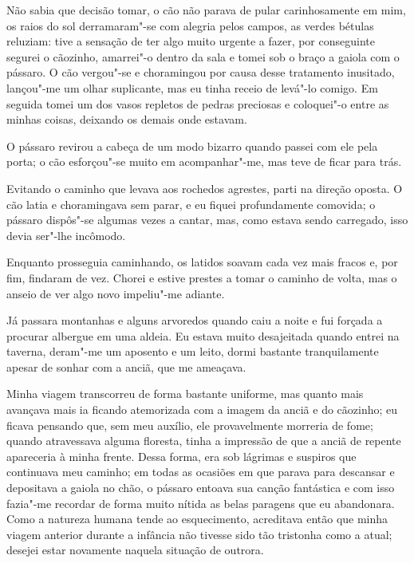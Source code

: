  Não sabia que decisão tomar, o cão não parava de pular carinhosamente
em mim, os raios do sol derramaram"-se com alegria pelos campos, as
verdes bétulas reluziam: tive a sensação de ter algo muito urgente a
fazer, por conseguinte segurei o cãozinho, amarrei"-o dentro da sala e
tomei sob o braço a gaiola com o pássaro. O cão vergou"-se e choramingou
por causa desse tratamento inusitado, lançou"-me um olhar suplicante,
mas eu tinha receio de levá"-lo comigo. Em seguida tomei um dos vasos
repletos de pedras preciosas e coloquei"-o entre as minhas coisas, deixando os
demais onde estavam.

 O pássaro revirou a cabeça de um modo bizarro quando passei com ele
pela porta; o cão esforçou"-se muito em acompanhar"-me, mas teve de
ficar para trás.

 Evitando o caminho que levava aos rochedos agrestes, parti na direção
oposta. O cão latia e choramingava sem parar, e eu fiquei profundamente
comovida; o pássaro dispôs"-se algumas vezes a cantar, mas, como estava
sendo carregado, isso devia ser"-lhe incômodo.

 Enquanto prosseguia caminhando, os latidos soavam cada vez mais
fracos e, por fim, findaram de vez. Chorei e estive prestes a tomar o
caminho de volta, mas o anseio de ver algo novo impeliu"-me adiante.

 Já passara montanhas e alguns arvoredos quando caiu a noite e fui
forçada a procurar albergue em uma aldeia. Eu estava muito desajeitada
quando entrei na taverna, deram"-me um aposento e um leito, dormi
bastante tranquilamente apesar de sonhar com a anciã, que me ameaçava.

 Minha viagem transcorreu de forma bastante uniforme, mas quanto mais
avançava mais ia ficando atemorizada com a imagem da anciã e do
cãozinho; eu ficava pensando que, sem meu auxílio, ele provavelmente
morreria de fome; quando atravessava alguma floresta, tinha a impressão
de que a anciã de repente apareceria à minha frente. Dessa forma, era
sob \mbox{lágrimas} e suspiros que continuava meu caminho; em todas as
ocasiões em que parava para descansar e depositava a gaiola no chão, o
pássaro entoava sua canção fantástica e com isso fazia"-me recordar de
forma muito nítida as belas paragens que eu abandonara. Como a
natureza humana tende ao esquecimento, acreditava então que minha
viagem anterior durante a infância não tivesse sido tão tristonha como
a atual; desejei estar novamente naquela situação de outrora.

